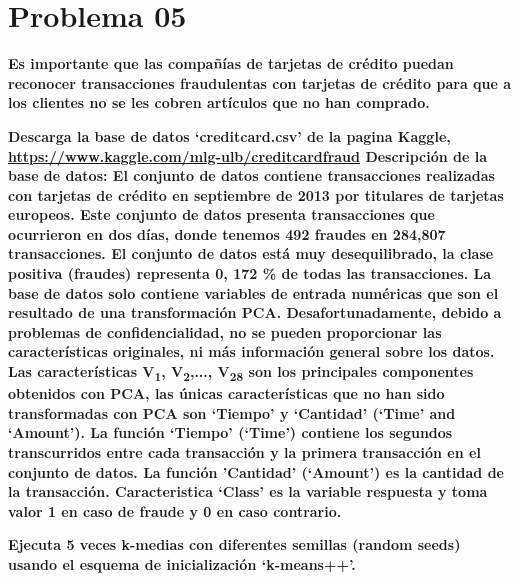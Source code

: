 \section*{Problema 05}

\textbf{Es importante que las compañías de tarjetas de crédito puedan reconocer transacciones fraudulentas con tarjetas de crédito para que a los clientes no se les cobren artículos que no han comprado.}

\textbf{Descarga la base de datos `creditcard.csv' de la pagina Kaggle, \url{https://www.kaggle.com/mlg-ulb/creditcardfraud} Descripción de la base de datos: El conjunto de datos contiene transacciones realizadas con tarjetas de crédito en septiembre de 2013 por titulares de tarjetas europeos. Este conjunto de datos presenta transacciones que ocurrieron en dos días, donde tenemos 492 fraudes en 284,807 transacciones. El conjunto de datos está muy desequilibrado, la clase positiva (fraudes) representa 0, 172 \% de todas las transacciones. La base de datos solo contiene variables de entrada numéricas que son el resultado de una transformación PCA. Desafortunadamente, debido a problemas de confidencialidad, no se pueden proporcionar las características originales, ni más información general sobre los datos. Las características V\textsubscript{1}, V\textsubscript{2},..., V\textsubscript{28} son los principales componentes obtenidos con PCA, las únicas características que no han sido transformadas con PCA son `Tiempo' y `Cantidad' (`Time' and `Amount'). La función `Tiempo' (`Time') contiene los segundos transcurridos entre cada transacción y la primera transacción en el conjunto de datos. La función 'Cantidad' (`Amount') es la cantidad de la transacción. Caracteristica `Class' es la variable respuesta y toma valor 1 en caso de fraude y 0 en caso contrario.}

\textbf{Ejecuta 5 veces k-medias con diferentes semillas (random seeds) usando el esquema de inicialización `k-means++'.}


